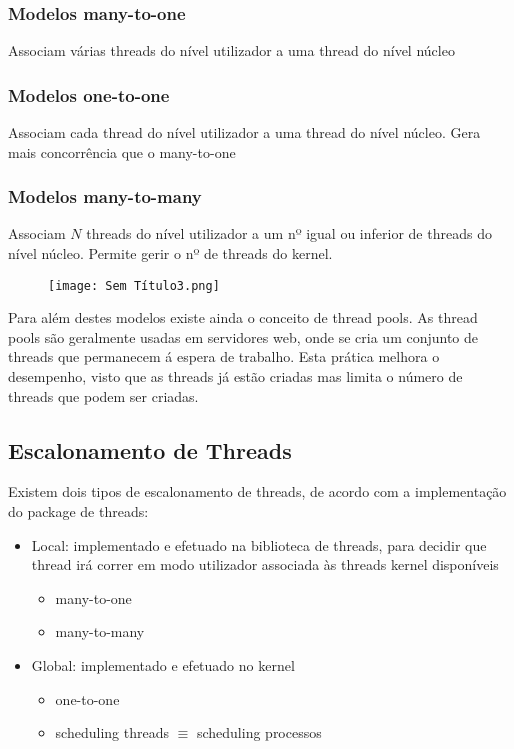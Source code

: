 \documentclass[10pt,a4paper]{report}
\begin{document}
\subsubsection{Modelos many-to-one}
Associam várias threads do nível utilizador a uma thread do nível núcleo
\subsubsection{Modelos one-to-one}
Associam cada thread do nível utilizador a uma thread do nível núcleo. Gera mais concorrência que o many-to-one
\subsubsection{Modelos many-to-many}
Associam $N$ threads do nível utilizador a um nº igual ou inferior de threads do nível núcleo. Permite gerir o nº de threads do kernel.
\begin{figure}[H]
\centering
\texttt{[image: Sem Título3.png]}
\end{figure}
Para além destes modelos existe ainda o conceito de thread pools. As thread pools são geralmente usadas em servidores web, onde se cria um conjunto de threads que permanecem á espera de trabalho. Esta prática melhora o desempenho, visto que as threads já estão criadas mas limita o número de threads que podem ser criadas.
\subsection{Escalonamento de Threads}
Existem dois tipos de escalonamento de threads, de acordo com a implementação do package de threads:
\begin{itemize}
\item Local: implementado e efetuado na biblioteca de threads, para decidir que thread irá correr em modo utilizador associada às threads kernel disponíveis
\begin{itemize}
\item many-to-one
\item many-to-many
\end{itemize}
\item Global: implementado e efetuado no kernel
\begin{itemize}
\item one-to-one
\item scheduling threads $\equiv$ scheduling processos
\end{itemize}
\end{itemize}
\end{document}
